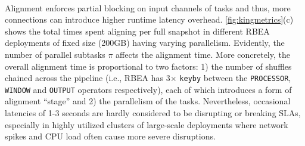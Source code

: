  \\
Alignment enforces partial blocking on input channels of tasks and thus, more connections can introduce higher runtime latency overhead. \autoref{fig:kingmetrics}(c) shows the total times spent aligning per full snapshot in different RBEA deployments of fixed size (200GB) having varying parallelism. Evidently, the number of parallel subtasks $\pi$ affects the alignment time. More concretely, the overall alignment time is proportional to two factors: 1) the number of shuffles chained across the pipeline (i.e., RBEA has 3$\times$ \texttt{keyby} between the \texttt{PROCESSOR}, \texttt{WINDOW} and \texttt{OUTPUT} operators respectively), each of which introduces a form of alignment ``stage'' and 2) the parallelism of the tasks. Nevertheless, occasional latencies of 1-3 seconds are hardly considered to be disrupting or breaking SLAs, especially in highly utilized clusters of large-scale deployments where network spikes and CPU load often cause more severe disruptions.



